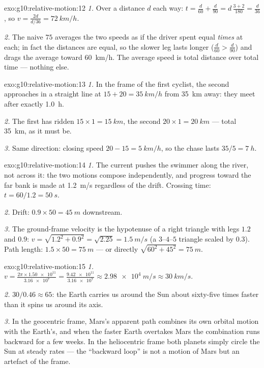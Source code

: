 \begin{solution}{exo:g10:relative-motion:12}
\emph{1.} Over a distance $d$ each way:
$t = \frac{d}{60} + \frac{d}{90} = d\,\frac{3 + 2}{180} = \frac{d}{36}$,
so $v = \frac{2d}{d/36} = \qty{72}{km/h}$.

\emph{2.} The naive $75$ averages the two speeds as if the driver spent
equal \emph{times} at each; in fact the distances are equal, so the
slower leg lasts longer ($\frac{d}{60} > \frac{d}{90}$) and drags the
average toward \qty{60}{km/h}. The average speed is total distance over
total time --- nothing else.
\end{solution}

\begin{solution}{exo:g10:relative-motion:13}
\emph{1.} In the frame of the first cyclist, the second approaches in a
straight line at $15 + 20 = \qty{35}{km/h}$ from \qty{35}{km} away:
they meet after exactly \qty{1.0}{h}.

\emph{2.} The first has ridden $15 \times 1 = \qty{15}{km}$, the second
$20 \times 1 = \qty{20}{km}$ --- total \qty{35}{km}, as it must be.

\emph{3.} Same direction: closing speed $20 - 15 = \qty{5}{km/h}$, so
the chase lasts $35/5 = \qty{7}{h}$.
\end{solution}

\begin{solution}{exo:g10:relative-motion:14}
\emph{1.} The current pushes the swimmer along the river, not across
it: the two motions compose independently, and progress toward the far
bank is made at \qty{1.2}{m/s} regardless of the drift. Crossing time:
$t = 60/1.2 = \qty{50}{s}$.

\emph{2.} Drift: $0.9 \times 50 = \qty{45}{m}$ downstream.

\emph{3.} The ground-frame velocity is the hypotenuse of a right
triangle with legs $1.2$ and $0.9$:
$v = \sqrt{1.2^2 + 0.9^2} = \sqrt{2.25} = \qty{1.5}{m/s}$ (a $3$--$4$--$5$
triangle scaled by $0.3$). Path length: $1.5 \times 50 = \qty{75}{m}$
--- or directly $\sqrt{60^2 + 45^2} = \qty{75}{m}$.
\end{solution}

\begin{solution}{exo:g10:relative-motion:15}
\emph{1.} $v = \frac{2\pi \times \num{1.50e11}}{\num{3.16e7}}
= \frac{\num{9.42e11}}{\num{3.16e7}} \approx \qty{2.98e4}{m/s}
\approx \qty{30}{km/s}$.

\emph{2.} $30 / 0.46 \approx 65$: the Earth carries us around the Sun
about sixty-five times faster than it spins us around its axis.

\emph{3.} In the geocentric frame, Mars's apparent path combines its
own orbital motion with the Earth's, and when the faster Earth
overtakes Mars the combination runs backward for a few weeks. In the
heliocentric frame both planets simply circle the Sun at steady rates
--- the ``backward loop'' is not a motion of Mars but an artefact of
the frame.
\end{solution}


